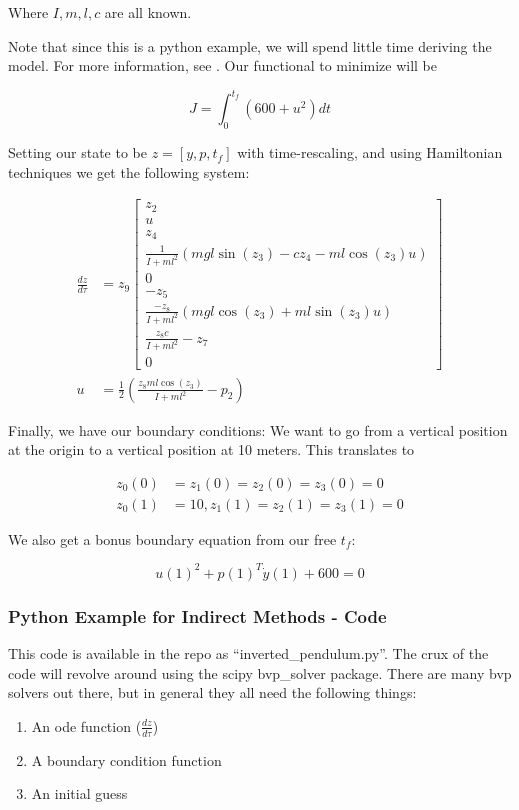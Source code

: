 ﻿\documentclass[twoside]{article}
\begin{document}
Where $I,m,l,c$ are all known.

Note that since this is a python example, we will spend little time deriving the model. For more information, see \cite{inverse_pendulum}. Our functional to minimize will be

\[J = \int_0^{t_f} (600 + u^2 )dt \]

Setting our state to be $z = [y,p,t_f]$ with time-rescaling, and using Hamiltonian techniques we get the following system:

\begin{align*}
    \frac{dz}{d\tau} &= z_9\begin{bmatrix}
        z_2 \\ u \\ z_4 \\
        \frac{1}{I+ml^2}(mgl\sin(z_3) - cz_4-ml\cos(z_3)u) \\
        0 \\ -z_5 \\ \frac{-z_8}{I+ml^2}(mgl\cos(z_3) + ml\sin(z_3)u) \\ \frac{z_8c}{I+ml^2}-z_7 \\ 0
    \end{bmatrix} \\
    u &= \frac{1}{2}(\frac{z_8ml\cos(z_3)}{I+ml^2}-p_2)
\end{align*}

Finally, we have our boundary conditions: We want to go from a vertical position at the origin to a vertical position at 10 meters. This translates to

\begin{align*}
    z_0(0) &= z_1(0) = z_2(0) = z_3(0) = 0 \\
    z_0(1) &= 10, z_1(1) = z_2(1) = z_3(1) = 0
\end{align*}

We also get a bonus boundary equation from our free $t_f$:

\[u(1)^2 + p(1)^T\dot{y}(1) + 600 = 0\]

\subsubsection{Python Example for Indirect Methods - Code}
This code is available in the repo as ``inverted\_pendulum.py''. The crux of the code will revolve around using the scipy bvp\_solver package. There are many bvp solvers out there, but in general they all need the following things:

\begin{enumerate}
    \item An ode function ($\frac{dz}{d\tau}$)
    \item A boundary condition function
    \item An initial guess
\end{enumerate}
\end{document}
